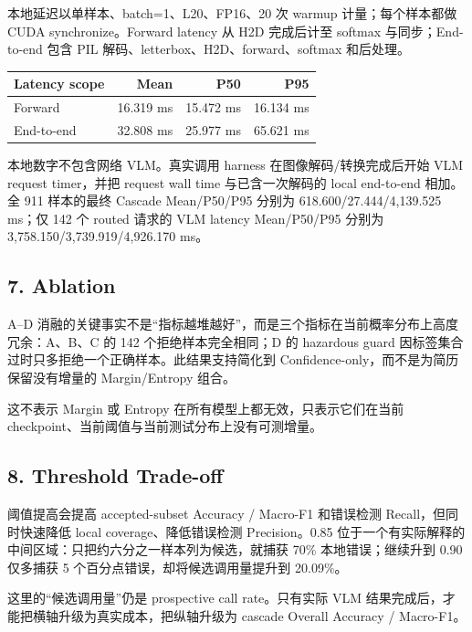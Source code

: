 \documentclass[
  a4paper,
]{article}
\begin{document}
本地延迟以单样本、batch=1、L20、FP16、20 次 warmup 计量；每个样本都做
CUDA synchronize。Forward latency 从 H2D 完成后计至 softmax
与同步；End-to-end 包含 PIL 解码、letterbox、H2D、forward、softmax
和后处理。

\begingroup
\small
\setlength{\tabcolsep}{3pt}
\begin{longtable}[]{@{}lrrr@{}}
\toprule
Latency scope & Mean & P50 & P95 \\
\midrule
\endhead
Forward & 16.319 ms & 15.472 ms & 16.134 ms \\
End-to-end & 32.808 ms & 25.977 ms & 65.621 ms \\
\bottomrule
\end{longtable}
\endgroup

本地数字不包含网络 VLM。真实调用 harness 在图像解码/转换完成后开始 VLM
request timer，并把 request wall time 与已含一次解码的 local end-to-end
相加。全 911 样本的最终 Cascade Mean/P50/P95 分别为
618.600/27.444/4,139.525 ms；仅 142 个 routed 请求的 VLM latency
Mean/P50/P95 分别为 3,758.150/3,739.919/4,926.170 ms。

\hypertarget{7-ablation}{%
\subsection{7. Ablation}\label{7-ablation}}

A--D
消融的关键事实不是``指标越堆越好''，而是三个指标在当前概率分布上高度冗余：A、B、C
的 142 个拒绝样本完全相同；D 的 hazardous guard
因标签集合过时只多拒绝一个正确样本。此结果支持简化到
Confidence-only，而不是为简历保留没有增量的 Margin/Entropy 组合。

这不表示 Margin 或 Entropy 在所有模型上都无效，只表示它们在当前
checkpoint、当前阈值与当前测试分布上没有可测增量。

\hypertarget{8-threshold-trade-off}{%
\subsection{8. Threshold Trade-off}\label{8-threshold-trade-off}}

阈值提高会提高 accepted-subset Accuracy / Macro-F1 和错误检测
Recall，但同时快速降低 local coverage、降低错误检测 Precision。0.85
位于一个有实际解释的中间区域：只把约六分之一样本列为候选，就捕获 70\%
本地错误；继续升到 0.90 仅多捕获 5 个百分点错误，却将候选调用量提升到
20.09\%。

这里的``候选调用量''仍是 prospective call rate。只有实际 VLM
结果完成后，才能把横轴升级为真实成本，把纵轴升级为 cascade Overall
Accuracy / Macro-F1。
\end{document}
